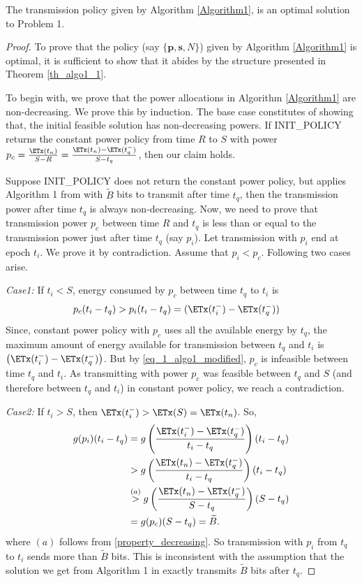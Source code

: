 \begin{theorem}
The transmission policy given by Algorithm \ref{Algorithm1}, is an optimal solution to Problem 1.
\label{th_algo1_2}
\end{theorem}


\begin{proof}
To prove that the policy (say $\{\textbf{p},\textbf{s},N\}$) given by Algorithm \ref{Algorithm1} is optimal, it is sufficient to show that it abides by the structure presented in Theorem \ref{th_algo1_1}.

To begin with, we prove that the power allocations in Algorithm \ref{Algorithm1} are non-decreasing. We prove this by induction. The base case constitutes of showing that, the initial feasible solution has non-decreasing powers. If INIT\_POLICY returns the constant power policy from time $R$ to $S$ with power $p_c=\frac{\ETx(t_n)}{S-R}=\frac{\ETx(t_n)-\ETx(t_q^-)}{S-t_q}$, then our claim holds. 

Suppose INIT\_POLICY does not return the constant power policy, but applies Algorithm 1 from \cite{Yang} with $\widetilde{B}$ bits to transmit after time $t_q$, then the transmission power after time $t_q$ is always non-decreasing. Now, we need to prove that transmission power $p_c$ between time $R$ and $t_q$ is less than or equal to the transmission power just after time $t_q$ (say $p_i$). Let transmission with $p_i$ end at epoch $t_i$. We prove it by contradiction. Assume that $p_i<p_c$. Following two cases arise.

\textit{Case1:} If $t_i<S$, energy consumed by $p_c$ between time $t_q$ to $t_i$ is 
\begin{align}
&p_c(t_i-t_q)>p_i(t_i-t_q)=(\ETx(t_i^-)-\ETx(t_q^-))\label{eq_1_algo1_modified}
\end{align}
Since, constant power policy with $p_c$ uses all the available energy by $t_q$, the maximum amount of energy available for transmission between $t_q$ and $t_i$ is $\left(\ETx(t_i^-)-\ETx(t_q^-)\right)$. But by \eqref{eq_1_algo1_modified}, $p_c$ is infeasible between time $t_q$ and $t_i$. As transmitting with power $p_c$ was feasible between $t_q$ and $S$ (and therefore between $t_q$ and $t_i$) in constant power policy, we reach a contradiction.        

\textit{Case2:} If $t_i>S$, then $\ETx(t_i^-)>\ETx(S)=\ETx(t_n)$. So, 
\begin{align}
g(p_i)(t_i-t_q)&=g\left(\frac{\ETx(t_i^-)-\ETx(t_q^-)}{t_i-t_q}\right)(t_i-t_q)
\\
&>g\left(\frac{\ETx(t_n)-\ETx(t_q^-)}{t_i-t_q}\right)(t_i-t_q)
\\
&\stackrel{(a)}{>}g\left(\frac{\ETx(t_n)-\ETx(t_q^-)}{S-t_q}\right)(S-t_q)\label{eq_2_algo1_modified}
\\
&=g(p_c)(S-t_q)=\widetilde{B}.
\end{align}
where %
$(a)$ follows from \eqref{property_decreasing}. So transmission with $p_i$ from $t_q$ to $t_i$ sends more than $\widetilde{B}$ bits. This is inconsistent with the assumption that the solution we get from Algorithm 1 in \cite{Yang} exactly transmits $\widetilde{B}$ bits after $t_q$. 


\end{proof}
